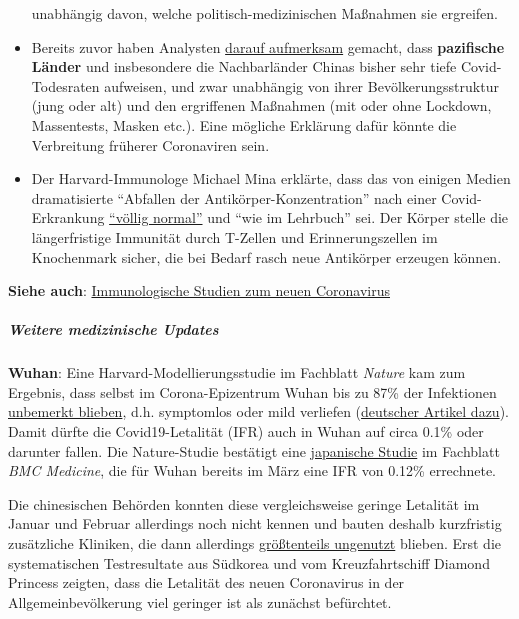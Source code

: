 \begin{itemize}
  unabhängig davon, welche politisch-medizinischen Maßnahmen sie
  ergreifen.
\item
  Bereits zuvor haben Analysten
  \href{https://twitter.com/boriquagato/status/1280212958392446977}{darauf
  aufmerksam} gemacht, dass \textbf{pazifische Länder} und insbesondere
  die Nachbarländer Chinas bisher sehr tiefe Covid-Todesraten aufweisen,
  und zwar unabhängig von ihrer Bevölkerungsstruktur (jung oder alt) und
  den ergriffenen Maßnahmen (mit oder ohne Lockdown, Massentests, Masken
  etc.). Eine mögliche Erklärung dafür könnte die Verbreitung früherer
  Coronaviren sein.
\item
  Der Harvard-Immunologe Michael Mina erklärte, dass das von einigen
  Medien dramatisierte ``Abfallen der Antikörper-Konzentration'' nach
  einer Covid-Erkrankung
  \href{https://www.nytimes.com/2020/07/22/health/covid-antibodies-herd-immunity.html}{``völlig
  normal''} und ``wie im Lehrbuch'' sei. Der Körper stelle die
  längerfristige Immunität durch T-Zellen und Erinnerungs­zellen im
  Knochenmark sicher, die bei Bedarf rasch neue Antikörper erzeugen
  können.
\end{itemize}

\textbf{Siehe auch}:
\href{https://swprs.org/studies-on-covid-19-lethality/}{Immunologische
Studien zum neuen Coronavirus}

\hypertarget{weitere-medizinische-updates}{%
\subparagraph{\texorpdfstring{\textbf{Weitere medizinische
Updates}}{Weitere medizinische Updates}}\label{weitere-medizinische-updates}}

\textbf{Wuhan}: Eine Harvard-Modellierungsstudie im Fachblatt
\emph{Nature} kam zum Ergebnis, dass selbst im Corona-Epizentrum Wuhan
bis zu 87\% der Infektionen
\href{https://news.harvard.edu/gazette/story/2020/07/study-finds-early-wuhan-covid-cases-largely-undetected/}{unbemerkt
blieben}, d.h. symptomlos oder mild verliefen
(\href{https://www.n-tv.de/wissen/Bis-zu-87-Prozent-der-Infektionen-unerkannt-article21917095.html}{deutscher
Artikel dazu}). Damit dürfte die Covid19-Letalität (IFR) auch in Wuhan
auf circa 0.1\% oder darunter fallen. Die Nature-Studie bestätigt eine
\href{https://www.medrxiv.org/content/10.1101/2020.02.12.20022434v3}{japanische
Studie} im Fachblatt \emph{BMC Medicine}, die für Wuhan bereits im März
eine IFR von 0.12\% errechnete.

Die chinesischen Behörden konnten diese vergleichsweise geringe
Letalität im Januar und Februar allerdings noch nicht kennen und bauten
deshalb kurzfristig zusätzliche Kliniken, die dann allerdings
\href{https://www.theguardian.com/world/2020/feb/12/what-chinas-empty-new-coronavirus-hospitals-say-about-its-secretive-system}{größtenteils
ungenutzt} blieben. Erst die systematischen Testresultate aus Südkorea
und vom Kreuzfahrtschiff Diamond Princess zeigten, dass die Letalität
des neuen Coronavirus in der Allgemeinbevölkerung viel geringer ist als
zunächst befürchtet.

